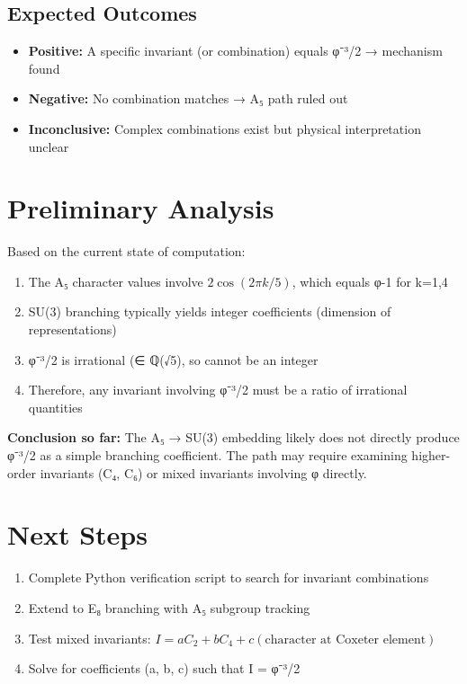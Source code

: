\documentclass{article}
\begin{document}
\subsection{Expected Outcomes}

\begin{itemize}
\item \textbf{Positive:} A specific invariant (or combination) equals φ⁻³/2 → mechanism found
\item \textbf{Negative:} No combination matches → A₅ path ruled out
\item \textbf{Inconclusive:} Complex combinations exist but physical interpretation unclear
\end{itemize}

\section{Preliminary Analysis}

Based on the current state of computation:

\begin{enumerate}
\item The A₅ character values involve $2\cos(2\pi k/5)$, which equals φ-1 for k=1,4
\item SU(3) branching typically yields integer coefficients (dimension of representations)
\item φ⁻³/2 is irrational (∈ ℚ(√5), so cannot be an integer
\item Therefore, any invariant involving φ⁻³/2 must be a ratio of irrational quantities
\end{enumerate}

\textbf{Conclusion so far:} The A₅ → SU(3) embedding likely does not directly produce φ⁻³/2 as a simple branching coefficient. The path may require examining higher-order invariants (C₄, C₆) or mixed invariants involving φ directly.

\section{Next Steps}

\begin{enumerate}
\item Complete Python verification script to search for invariant combinations
\item Extend to E₈ branching with A₅ subgroup tracking
\item Test mixed invariants: $I = a C_2 + b C_4 + c (\text{character at Coxeter element})$
\item Solve for coefficients (a, b, c) such that I = φ⁻³/2
\end{enumerate}
\end{document}
